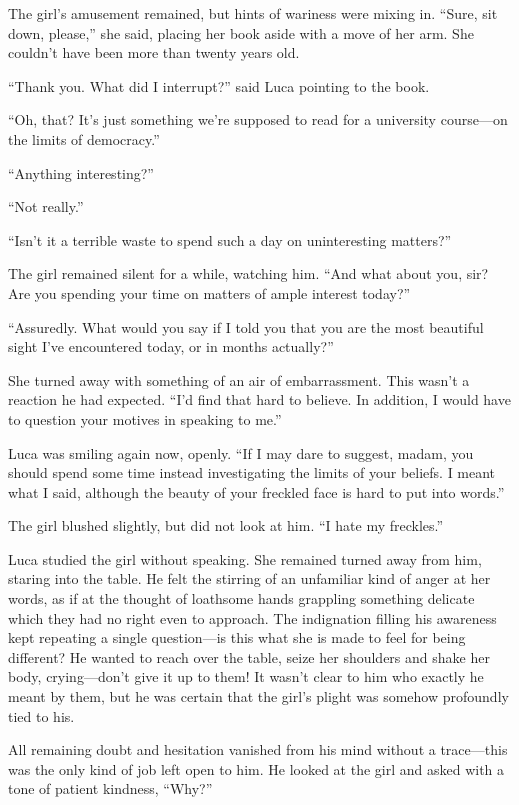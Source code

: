 The girl's amusement remained, but hints of wariness were mixing in. ``Sure, sit down, please,'' she said, placing her book aside with a move of her arm. She couldn't have been more than twenty years old.

``Thank you. What did I interrupt?'' said Luca pointing to the book.

``Oh, that? It's just something we're supposed to read for a university course---on the limits of democracy.''

``Anything interesting?''

``Not really.''

``Isn't it a terrible waste to spend such a day on uninteresting matters?''

The girl remained silent for a while, watching him. ``And what about you, sir? Are you spending your time on matters of ample interest today?''

``Assuredly. What would you say if I told you that you are the most beautiful sight I've encountered today, or in months actually?''

She turned away with something of an air of embarrassment. This wasn't a reaction he had expected. ``I'd find that hard to believe. In addition, I would have to question your motives in speaking to me.''

Luca was smiling again now, openly. ``If I may dare to suggest, madam, you should spend some time instead investigating the limits of your beliefs. I meant what I said, although the beauty of your freckled face is hard to put into words.''

The girl blushed slightly, but did not look at him. ``I hate my freckles.''

Luca studied the girl without speaking. She remained turned away from him, staring into the table. He felt the stirring of an unfamiliar kind of anger at her words, as if at the thought of loathsome hands grappling something delicate which they had no right even to approach. The indignation filling his awareness kept repeating a single question---is this what she is made to feel for being different? He wanted to reach over the table, seize her shoulders and shake her body, crying---don't give it up to them! It wasn't clear to him who exactly he meant by them, but he was certain that the girl's plight was somehow profoundly tied to his.

All remaining doubt and hesitation vanished from his mind without a trace---this was the only kind of job left open to him. He looked at the girl and asked with a tone of patient kindness, ``Why?''

